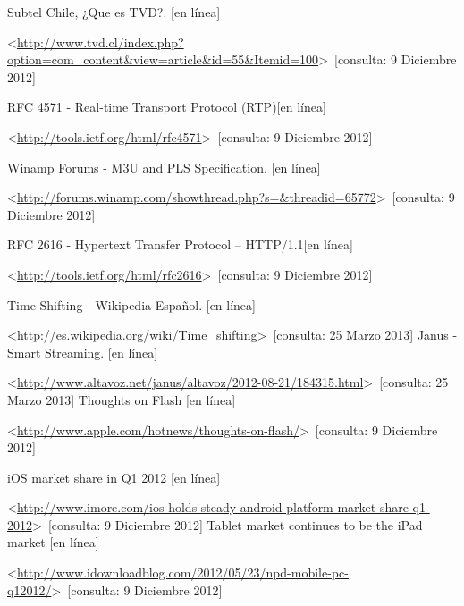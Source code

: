 
\begin{thebibliography}{99}
\begin{sloppypar}



%
Subtel Chile, ¿Que es TVD?. [en línea]\

\textless \url{http://www.tvd.cl/index.php?option=com_content&view=article&id=55&Itemid=100}\textgreater \ [consulta: 9 Diciembre 2012]

%
RFC 4571 - Real-time Transport Protocol (RTP)[en línea]\

\textless \url{http://tools.ietf.org/html/rfc4571}\textgreater \ [consulta: 9 Diciembre 2012]

%
Winamp Forums - M3U and PLS Specification. [en línea]\

\textless \url{http://forums.winamp.com/showthread.php?s=&threadid=65772}\textgreater \ [consulta: 9 Diciembre 2012]

%
RFC 2616 - Hypertext Transfer Protocol -- HTTP/1.1[en línea]\

\textless \url{http://tools.ietf.org/html/rfc2616}\textgreater \ [consulta: 9 Diciembre 2012]

%
%
Time Shifting - Wikipedia Español. [en línea]\

\textless \url{http://es.wikipedia.org/wiki/Time_shifting}\textgreater \ [consulta: 25 Marzo 2013]
%
Janus - Smart Streaming. [en línea]\

\textless \url{http://www.altavoz.net/janus/altavoz/2012-08-21/184315.html}\textgreater \ [consulta: 25 Marzo 2013]
%
Thoughts on Flash [en línea]\

\textless \url{http://www.apple.com/hotnews/thoughts-on-flash/}\textgreater \ [consulta: 9 Diciembre 2012]

%
iOS market share in Q1 2012 [en línea] \

\textless \url{http://www.imore.com/ios-holds-steady-android-platform-market-share-q1-2012}\textgreater \ [consulta: 9 Diciembre 2012]
%
Tablet market continues to be the iPad market [en línea] \

\textless \url{http://www.idownloadblog.com/2012/05/23/npd-mobile-pc-q12012/}\textgreater \ [consulta: 9 Diciembre 2012]


\end{sloppypar}
\end{thebibliography}
